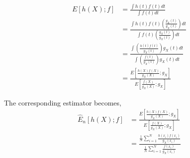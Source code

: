 \begin{equation*} \label{eq:unnormalized}
\begin{split}
E[h(X);f] & = \frac{\int h(t)f(t) dt}{\int f(t) dt} \\
& = \frac{\int h(t)f(t) \left ( \frac{g_X(t)}{g_X(t)} \right ) dt}{{\int f(t)} \left ( \frac{g_X(t)}{g_X(t)} \right ) dt} \\
& = \frac{\int \left ( \frac{h(t)f(t)}{g_X(t)} \right ) g_X(t) dt}{\int \left ( \frac{f(t)}{g_X(t)} \right ) g_X(t) dt} \\
& = \frac{E\left [ \frac{h(X)f(X)}{g_X(X)} ; g_X \right ]}{E\left [ \frac{f(X)}{g_X(X)} ; g_X \right ]}
\end{split}
\end{equation*}

The corresponding estimator becomes,
\begin{equation*}
\begin{split}
\widehat{E}_n[h(X);f] & = \frac{E\left [ \frac{h(X)f(X)}{g_X(X)} ; g_X \right ]}{E\left [ \frac{f(X)}{g_X(X)} ; g_X \right ]} \\
& = \frac{\frac{1}{N}\sum_{i = 1}^{N}\frac{h(x_i)f(x_i)}{g_X(x_i)}}{\frac{1}{N}\sum_{i = 1}^{N}\frac{f(x_i)}{g_X(x_i)}} \\
\end{split}
\end{equation*}
